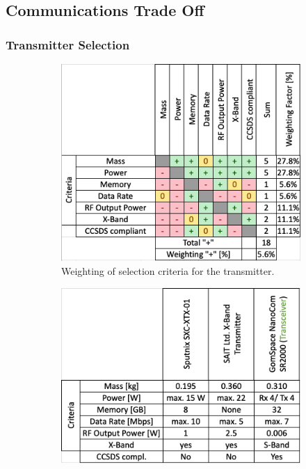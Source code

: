 \subsection{Communications Trade Off}
\label{app:Com_TrOff}

\subsubsection{Transmitter Selection}
\begin{figure}[h]
     \centering
     \begin{subfigure}[b]{0.49\textwidth}
         \centering
         \includegraphics[width=\textwidth]{Media/Trade_off/Transmitter/Weighting_trans.png}
         \caption{Weighting of selection criteria for the transmitter.}
         \label{fig:Weighting_trans}
     \end{subfigure}
     \hfill
     \begin{subfigure}[b]{0.49\textwidth}
         \centering
         \includegraphics[width=\textwidth]{Media/Trade_off/Transmitter/Values_trans.png}

\end{subfigure}
\end{figure}
